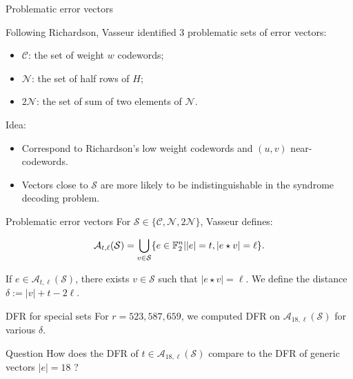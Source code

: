 \begin{frame}{Problematic error vectors}

    Following Richardson, Vasseur identified $3$ problematic sets of error vectors:

    \begin{itemize}
        \item $\mathcal{C}$: the set of weight $w$ codewords;
        \item $\mathcal{N}$: the set of half rows of $H$;
        \item $2\mathcal{N}$: the set of sum of two elements of $\mathcal{N}$.
    \end{itemize}
    
    Idea:
    \begin{itemize}
        \item Correspond to Richardson's low weight codewords and $(u,v)$ near-codewords.
        \item Vectors close to $\mathcal{S}$ are more likely to be indistinguishable in the syndrome decoding problem.
    \end{itemize}

    
\end{frame}

\begin{frame}{Problematic error vectors}
        For $\mathcal{S} \in \{ \mathcal{C},\mathcal{N}, 2\mathcal{N}\}$, Vasseur defines:
    
    \[
    \mathcal{A}_{t,\ell}(\mathcal{S}) = \bigcup_{v \in \mathcal{S}} \{ e \in \mathbb{F}_2^n| |e| = t, |e \star v| = \ell \}.
    \]
    
    If $e \in \mathcal{A}_{t,\ell}(\mathcal{S})$, there exists $v\in \mathcal{S}$ such that $|e \star v| = \ell$. We define the distance $\delta:= |v| + t - 2\ell$.
    
\end{frame}



\begin{frame}{DFR for special sets}
    For $r = 523,587,659$, we computed DFR on $\mathcal{A}_{18,\ell}(\mathcal{S})$ for various $\delta$.
    
    \begin{block}{Question}
    How does the DFR of $t \in \mathcal{A}_{18,\ell}(\mathcal{S})$ compare to the DFR of generic vectors $|e| = 18$ ?
    \end{block}
\end{frame}

